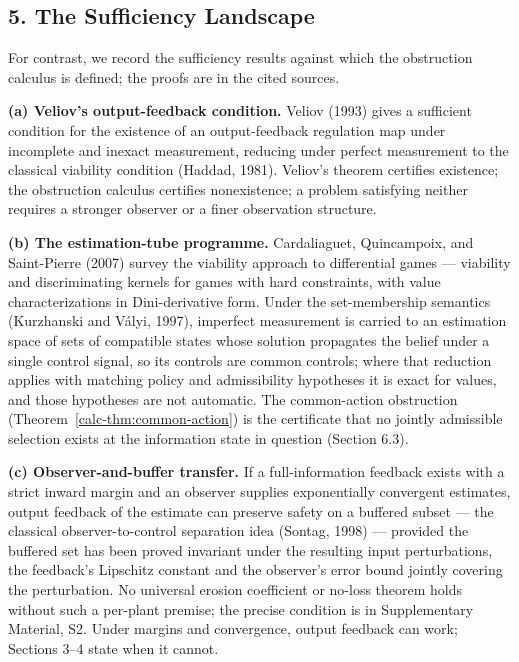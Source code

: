 \documentclass[10pt,twocolumn]{article}
\theoremstyle{definition}
\begin{document}
\subsection{5. The Sufficiency Landscape}\label{calc-the-sufficiency-landscape-cited}

For contrast, we record the sufficiency results against which the obstruction calculus is defined; the proofs are in the cited sources.

\textbf{(a) Veliov's output-feedback condition.} Veliov (1993) gives a sufficient condition for the existence of an output-feedback regulation map under incomplete and inexact measurement, reducing under perfect measurement to the classical viability condition (Haddad, 1981). Veliov's theorem certifies existence; the obstruction calculus certifies nonexistence; a problem satisfying neither requires a stronger observer or a finer observation structure.

\textbf{(b) The estimation-tube programme.} Cardaliaguet, Quincampoix, and Saint-Pierre (2007) survey the viability approach to differential games --- viability and discriminating kernels for games with hard constraints, with value characterizations in Dini-derivative form. Under the set-membership semantics (Kurzhanski and V\'alyi, 1997), imperfect measurement is carried to an estimation space of sets of compatible states whose solution propagates the belief under a single control signal, so its controls are common controls; where that reduction applies with matching policy and admissibility hypotheses it is exact for values, and those hypotheses are not automatic. The common-action obstruction (Theorem~\ref{calc-thm:common-action}) is the certificate that no jointly admissible selection exists at the information state in question (Section 6.3).

\textbf{(c) Observer-and-buffer transfer.} If a full-information feedback exists with a strict inward margin and an observer supplies exponentially convergent estimates, output feedback of the estimate can preserve safety on a buffered subset --- the classical observer-to-control separation idea (Sontag, 1998) --- provided the buffered set has been proved invariant under the resulting input perturbations, the feedback's Lipschitz constant and the observer's error bound jointly covering the perturbation. No universal erosion coefficient or no-loss theorem holds without such a per-plant premise; the precise condition is in Supplementary Material, S2. Under margins and convergence, output feedback can work; Sections 3--4 state when it cannot.
\end{document}
